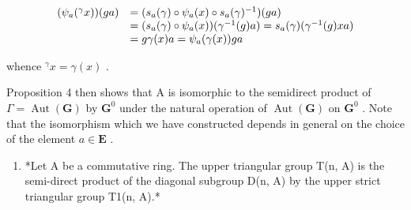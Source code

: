 \[
\begin{array}{r l} (\psi_ {a} (^ {\gamma} x)) (g a) & = (s _ {a} (\gamma) \circ \psi_ {a} (x) \circ s _ {a} (\gamma) ^ {- 1}) (g a) \\ & = (s _ {a} (\gamma) \circ \psi_ {a} (x)) (\gamma^ {- 1} (g) a) = s _ {a} (\gamma) (\gamma^ {- 1} (g) x a) \\ & = g \gamma (x) a = \psi_ {a} (\gamma (x)) g a \end{array}
\]

whence \({}^{\gamma}x = \gamma(x)\) .

Proposition 4 then shows that A is isomorphic to the semidirect product of \(\Gamma = \operatorname{Aut}(\mathbf{G})\) by \(\mathbf{G}^0\) under the natural operation of \(\operatorname{Aut}(\mathbf{G})\) on \(\mathbf{G}^0\) . Note that the isomorphism which we have constructed depends in general on the choice of the element \(a \in \mathbf{E}\) .

\begin{enumerate}
\def\labelenumi{(\arabic{enumi})}
\setcounter{enumi}{1}
\tightlist
\item
  *Let A be a commutative ring. The upper triangular group T(n, A) is the semi-direct product of the diagonal subgroup D(n, A) by the upper strict triangular group T1(n, A).*
\end{enumerate}


